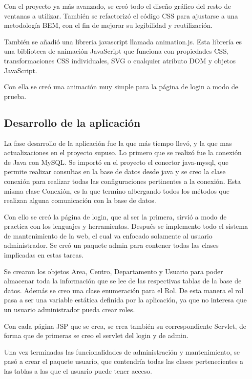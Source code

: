 Con el proyecto ya más avanzado, se creó todo el diseño gráfico del resto de ventanas a utilizar. También se refactorizó el código CSS para ajustarse a una metodología BEM, con el fin de mejorar su legibilidad y reutilización.

También se añadió una libreria javascript llamada animation.js. Esta librería es una biblioteca de animación JavaScript que funciona con propiedades CSS, transformaciones CSS individuales, SVG o cualquier atributo DOM y objetos JavaScript.

Con ella se creó una animación muy simple para la página de login a modo de prueba.


\subsection{Desarrollo de la aplicación}

La fase desarrollo de la aplicación fue la que más tiempo llevó, y la que mas actualizaciones en el proyecto supuso. Lo primero que se realizó fue la conexión de Java con MySQL. Se importó en el proyecto el conector java-mysql, que permite realizar consultas en la base de datos desde java y se creo la clase conexión para realizar todas las configuraciones pertinentes a la conexión. Esta misma clase Conexión, es la que termino albergando todos los métodos  que realizan alguna comunicación con la base de datos.

Con ello se creó la página de login, que al ser la primera, sirvió a modo de practica con los lenguajes y herramientas. Después se implemento todo el sistema de mantenimiento de la web, el cual va enfocado solamente al usuario administrador. Se creó un paquete admin para contener todas las clases implicadas en estas tareas. 

Se crearon los objetos Area, Centro, Departamento y Usuario para poder almacenar toda la información que se lee de las respectivas tablas de la base de datos. Además se creo una clase enumeración para el Rol. De esta manera el rol pasa a ser una variable estática definida por la aplicación, ya que no interesa que un usuario administrador pueda crear roles.

Con cada página JSP que se crea, se crea también su correspondiente Servlet, de forma que de primeras se creo el servlet del login y de admin.

Una vez terminadas las funcionalidades de administración y mantenimiento,  se pasó a crear el paquete usuario, que contendría todas las clases pertenecientes a las tablas a las que el usuario puede tener acceso.

